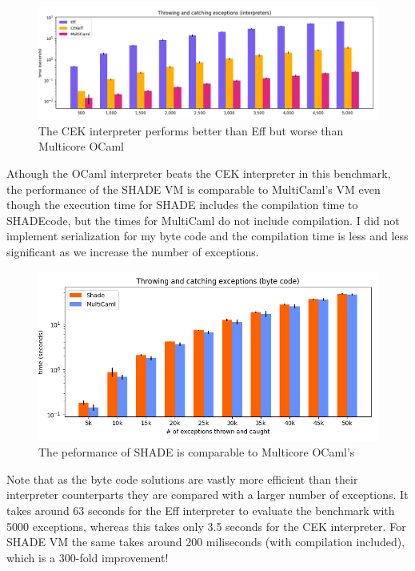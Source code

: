 \documentclass[class=article, crop=false]{standalone}
\begin{document}
\begin{figure}
    \centering
    \includegraphics[width=40em]{eval_plots/interp_exception.png}
    \caption{The CEK interpreter performs better than Eff but worse than Multicore OCaml}
    \label{fig:exception-interpreters}
\end{figure}

Athough the OCaml interpreter beats the CEK interpreter in this benchmark, the performance of the SHADE VM
is comparable to MultiCaml's VM even though the execution time for SHADE includes the compilation time to SHADEcode,
but the times for MultiCaml do not include compilation. I did not implement
serialization for my byte code and the compilation time is less and less significant as we increase the number of exceptions.

\begin{figure}
    \centering
    \includegraphics[width=35em]{eval_plots/comp_exception.png}
    \caption{The peformance of SHADE is comparable to Multicore OCaml's}
    \label{fig:exception-bytecode}
\end{figure}

Note that as the byte code solutions are vastly more efficient than their interpreter counterparts they are compared with a larger number of exceptions.
It takes around 63 seconds for the Eff interpreter to evaluate the benchmark with 5000 exceptions, whereas this takes only
3.5 seconds for the CEK interpreter. For SHADE VM the same takes around 200 miliseconds (with compilation included),
which is a 300-fold improvement!
\end{document}
